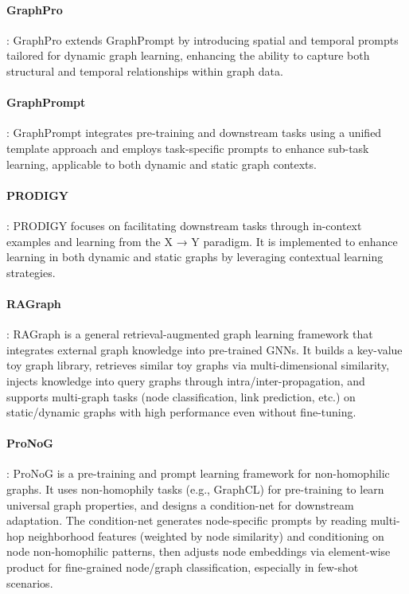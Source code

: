 \paragraph{GraphPro \cite{graphpro_reference}}: GraphPro extends GraphPrompt by introducing spatial and temporal prompts tailored for dynamic graph learning, enhancing the ability to capture both structural and temporal relationships within graph data.

\paragraph{GraphPrompt \cite{graphprompt_reference}}: GraphPrompt integrates pre-training and downstream tasks using a unified template approach and employs task-specific prompts to enhance sub-task learning, applicable to both dynamic and static graph contexts.

\paragraph{PRODIGY \cite{prodigy_reference}}: PRODIGY focuses on facilitating downstream tasks through in-context examples and learning from the X → Y paradigm. It is implemented to enhance learning in both dynamic and static graphs by leveraging contextual learning strategies.

\paragraph{RAGraph \cite{JiangQXZZ00X0W24}}: RAGraph is a general retrieval-augmented graph learning framework that integrates external graph knowledge into pre-trained GNNs. It builds a key-value toy graph library, retrieves similar toy graphs via multi-dimensional similarity, injects knowledge into query graphs through intra/inter-propagation, and supports multi-graph tasks (node classification, link prediction, etc.) on static/dynamic graphs with high performance even without fine-tuning.





\paragraph{ProNoG \cite{yu2024nonhomophilic}}: ProNoG is a pre-training and prompt learning framework for non-homophilic graphs. It uses non-homophily tasks (e.g., GraphCL) for pre-training to learn universal graph properties, and designs a condition-net for downstream adaptation. The condition-net generates node-specific prompts by reading multi-hop neighborhood features (weighted by node similarity) and conditioning on node non-homophilic patterns, then adjusts node embeddings via element-wise product for fine-grained node/graph classification, especially in few-shot scenarios.



